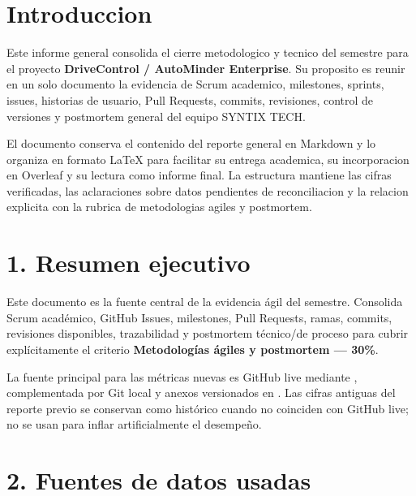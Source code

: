 \documentclass[11pt,a4paper]{article}
\begin{document}

\section*{Introduccion}

Este informe general consolida el cierre metodologico y tecnico del semestre para el proyecto \textbf{DriveControl / AutoMinder Enterprise}. Su proposito es reunir en un solo documento la evidencia de Scrum academico, milestones, sprints, issues, historias de usuario, Pull Requests, commits, revisiones, control de versiones y postmortem general del equipo SYNTIX TECH.

El documento conserva el contenido del reporte general en Markdown y lo organiza en formato LaTeX para facilitar su entrega academica, su incorporacion en Overleaf y su lectura como informe final. La estructura mantiene las cifras verificadas, las aclaraciones sobre datos pendientes de reconciliacion y la relacion explicita con la rubrica de metodologias agiles y postmortem.

\section{1. Resumen ejecutivo}

Este documento es la fuente central de la evidencia ágil del semestre. Consolida Scrum académico, GitHub Issues, milestones, Pull Requests, ramas, commits, revisiones disponibles, trazabilidad y postmortem técnico/de proceso para cubrir explícitamente el criterio \textbf{Metodologías ágiles y postmortem --- 30\%}.

La fuente principal para las métricas nuevas es GitHub live mediante \texttt{}, complementada por Git local y anexos versionados en \texttt{}. Las cifras antiguas del reporte previo se conservan como histórico cuando no coinciden con GitHub live; no se usan para inflar artificialmente el desempeño.

\section{2. Fuentes de datos usadas}
\end{document}
